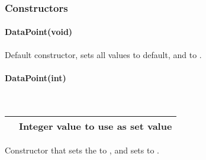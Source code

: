 \documentclass[letterpaper,10pt,english]{sphinxmanual}
\begin{document}
\subsubsection{Constructors}
\label{\detokenize{datapoint:constructors}}

\paragraph{DataPoint(void)}
\label{\detokenize{datapoint:datapoint-void}}

\begin{fulllineitems}
\label{\detokenize{datapoint:_CPPv2N6pessum9DataPoint9DataPointEv}}%
\pysigstartmultiline
{}%
\pysigstopmultiline
Default constructor, sets all values to default, and  to
.

\end{fulllineitems}



\paragraph{DataPoint(int)}
\label{\detokenize{datapoint:datapoint-int}}

\begin{fulllineitems}
\label{\detokenize{datapoint:_CPPv2N6pessum9DataPoint9DataPointEi}}%
\pysigstartmultiline
{}%
\pysigstopmultiline~

\begin{savenotes}\sphinxattablestart
\centering
\begin{tabulary}{\linewidth}[t]{|T|T|}
\hline

&
Integer value to use as set value
\\
\hline
\end{tabulary}
\par
\sphinxattableend\end{savenotes}

Constructor that sets the  to , and sets
 to .

\end{fulllineitems}
\end{document}
